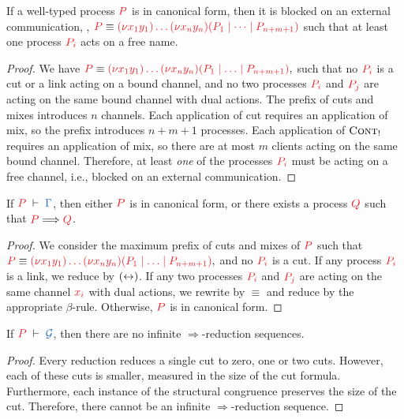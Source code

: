 \documentclass[envcountsame,UKenglish]{llncs}
\begin{document}
\begin{lemma}
  If a well-typed process $\tm{P}$ is in canonical form, then it is blocked on
  an external communication, \ie,
  $\tm{P}\equiv\tm{\piNew{x_1}{y_1}{\dots\piNew{x_n}{y_n}{(P_1\mid\dots\mid P_{n+m+1})}}}$
  such that at least one process $\tm{P_i}$ acts on a free name.
\end{lemma}
\begin{proof}
  We have
  \(
  \tm{P} \equiv \tm{\piNew{x_1}{y_1}{\dots\piNew{x_n}{y_n}{(P_1 \ppar \dots \ppar P_{n+m+1})}}},
  \)
  such that no $\tm{P_i}$ is a cut or a link acting on a bound channel, and no two processes $\tm{P_i}$ and $\tm{P_j}$ are acting on the same bound channel with dual actions. The prefix of cuts and mixes introduces $n$ channels. Each application of cut requires an application of mix, so the prefix introduces $n+m+1$ processes. Each application of $\textsc{Cont}_{!}$ requires an application of mix, so there are at most $m$ clients acting on the same bound channel. Therefore, at least \emph{one} of the processes $\tm{P_i}$ must be acting on a free channel, i.e., blocked on an external communication.
\end{proof}
\begin{theorem}[Progress]\label{thm:nodcap-progress}
  If $\seq[P]{\Gamma}$, then either $\tm{P}$ is in canonical form, or there exists a process $\tm{Q}$ such that $\tm{P}\Longrightarrow\tm{Q}$.
\end{theorem} 
\begin{proof}
  We consider the maximum prefix of cuts and mixes of $\tm{P}$ such that
  \(
  \tm{P} \equiv \tm{\piNew{x_1}{y_1}{\dots\piNew{x_n}{y_n}{(P_1 \ppar \dots \ppar P_{n+m+1})}}},
  \)
  and no $\tm{P_i}$ is a cut. If any process $\tm{P_i}$ is a link, we reduce by $({\leftrightarrow})$. If any two processes $\tm{P_i}$ and $\tm{P_j}$ are acting on the same channel $\tm{x_i}$ with dual actions, we rewrite by $\equiv$ and reduce by the appropriate $\beta$-rule. Otherwise, $\tm{P}$ is in canonical form.
\end{proof}
\begin{theorem}[Termination]\label{thm:nodcap-termination}
  If $\seq[P]{\mathcal{G}}$, then there are no infinite $\Longrightarrow$-reduction sequences.
\end{theorem} 
\begin{proof}
  Every reduction reduces a single cut to zero, one or two cuts. However, each of these cuts is smaller, measured in the size of the cut formula. Furthermore, each instance of the structural congruence preserves the size of the cut. Therefore, there cannot be an infinite $\Longrightarrow$-reduction sequence.
\end{proof}
\end{document}
